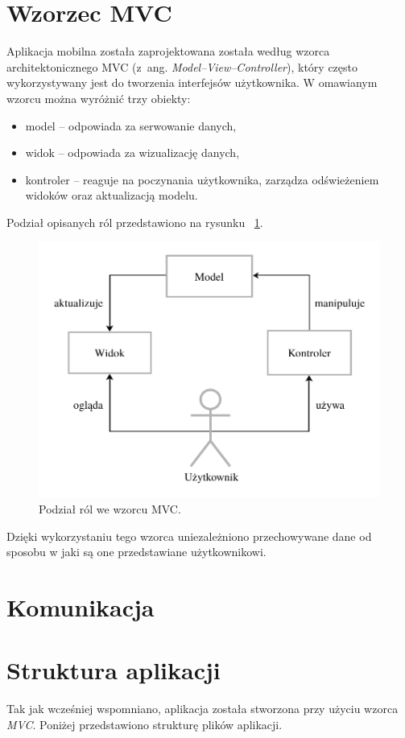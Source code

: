 \section{Wzorzec MVC}
Aplikacja mobilna została zaprojektowana została według wzorca architektonicznego MVC (z~ang. \textit{Model–View–Controller}), który często wykorzystywany jest do tworzenia interfejsów użytkownika. W omawianym wzorcu można wyróżnić trzy obiekty:
\begin{itemize}
\item model – odpowiada za serwowanie danych,
\item widok – odpowiada za wizualizację danych, 
\item kontroler – reaguje na poczynania użytkownika, zarządza odświeżeniem widoków oraz aktualizacją modelu. 
\end{itemize}
Podział opisanych ról przedstawiono na rysunku ~\ref{fig:mvc}.
\begin{figure}[H]
	\centering
		\includegraphics[width=0.75\linewidth]{pic05/mvc.pdf}
	\caption{Podział ról we wzorcu MVC.}
	\label{fig:mvc}	
\end{figure}

Dzięki wykorzystaniu tego wzorca uniezależniono przechowywane dane od sposobu w jaki są one przedstawiane użytkownikowi.

\section{Komunikacja}


\section{Struktura aplikacji}
Tak jak wcześniej wspomniano, aplikacja została stworzona przy użyciu wzorca \textit{MVC}. Poniżej przedstawiono strukturę plików aplikacji.

